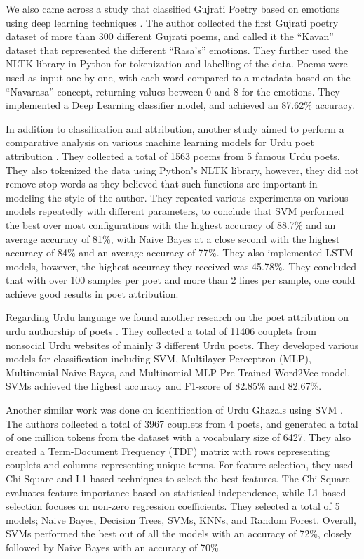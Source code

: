 We also came across a study that classified Gujrati Poetry based on emotions using deep learning techniques \cite{gujrati_poetry_attribution}. The author collected the first Gujrati poetry dataset of more than 300 different Gujrati poems, and called it the ``Kavan'' dataset that represented the different ``Rasa's'' emotions. They further used the NLTK library in Python for tokenization and labelling of the data. Poems were used as input one by one, with each word compared to a metadata based on the ``Navarasa'' concept, returning values between 0 and 8 for the emotions. They implemented a Deep Learning classifier model, and achieved an 87.62\% accuracy. 

In addition to classification and attribution, another study aimed to perform a comparative analysis on various machine learning models for Urdu poet attribution \cite{urdu_poet_attribution_kiet}. They collected a total of 1563 poems from 5 famous Urdu poets. They also tokenized the data using Python's NLTK library, however, they did not remove stop words as they believed that such functions are important in modeling the style of the author. They repeated various experiments on various models repeatedly with different parameters, to conclude that SVM performed the best over most configurations with the highest accuracy of 88.7\% and an average accuracy of 81\%, with Naive Bayes at a close second with the highest accuracy of 84\% and an average accuracy of 77\%. They also implemented LSTM models, however, the highest accuracy they received was 45.78\%. They concluded that with over 100 samples per poet and more than 2 lines per sample, one could achieve good results in poet attribution. 

Regarding Urdu language we found another research on the poet attribution on urdu authorship of poets \cite{urdu_authorship_attribution}. They collected a total of 11406 couplets from nonsocial Urdu websites of mainly 3 different Urdu poets. They developed various models for classification including SVM, Multilayer Perceptron (MLP), Multinomial Naive Bayes, and Multinomial MLP Pre-Trained Word2Vec model. SVMs achieved the highest accuracy and F1-score of 82.85\% and 82.67\%. 

Another similar work was done on identification of Urdu Ghazals using SVM \cite{urdu_ghazal_svm}. The authors collected a total of 3967 couplets from 4 poets, and generated a total of one million tokens from the dataset with a vocabulary size of 6427. They also created a Term-Document Frequency (TDF) matrix with rows representing couplets and columns representing unique terms. For feature selection, they used Chi-Square and L1-based techniques to select the best features. The Chi-Square evaluates feature importance based on statistical independence, while L1-based selection focuses on non-zero regression coefficients. They selected a total of 5 models; Naive Bayes, Decision Trees, SVMs, KNNs, and Random Forest. Overall, SVMs performed the best out of all the models with an accuracy of 72\%, closely followed by Naive Bayes with an accuracy of 70\%.

